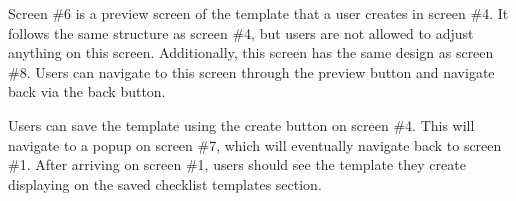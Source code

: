 

Screen \#6 is a preview screen of the template that a user creates in screen \#4. It follows the same structure as screen \#4, but users are not allowed to adjust anything on this screen. Additionally, this screen has the same design as screen \#8. Users can navigate to this screen through the preview button and navigate back via the back button.

Users can save the template using the create button on screen \#4. This will navigate to a popup on screen \#7, which will eventually navigate back to screen \#1. After arriving on screen \#1, users should see the template they create displaying on the saved checklist templates section.














